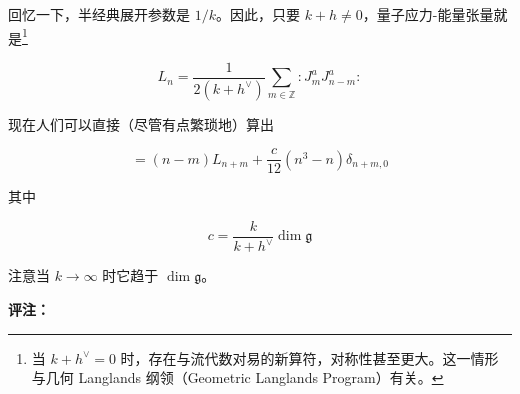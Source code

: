 回忆一下，半经典展开参数是 $1/k$。因此，只要 $k+h\neq0$，量子应力-能量张量就是\footnote{当 $k+h^\vee=0$ 时，存在与流代数对易的新算符，对称性甚至更大。这一情形与几何 Langlands 纲领（Geometric Langlands Program）有关。}

\begin{equation}
  L_n=\frac{1}{2(k+h^\vee)}\sum_{m\in\mathbb{Z}}:J^a_mJ^a_{n-m}:
  \tag{4.85}
  \label{eq:4.85}
\end{equation}

现在人们可以直接（尽管有点繁琐地）算出

\begin{equation}
  [L_n,L_m]=(n-m)L_{n+m}+\frac{c}{12}(n^3-n)\delta_{n+m,0}
  \tag{4.86}
  \label{eq:4.86}
\end{equation}

其中

\begin{equation}
  c=\frac{k}{k+h^\vee}\dim\mathfrak{g}
  \tag{4.87}
  \label{eq:4.87}
\end{equation}

注意当 $k\to\infty$ 时它趋于 $\dim\mathfrak{g}$。

\textbf{评注：}

